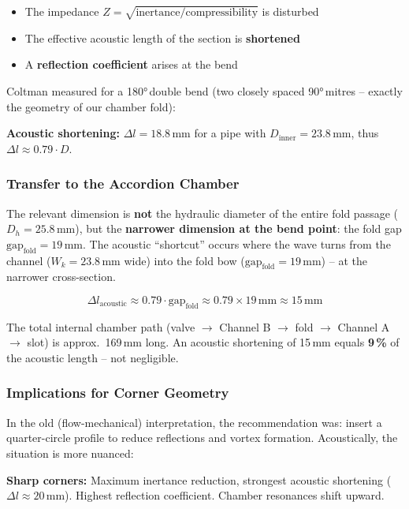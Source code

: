 \documentclass[11pt,a4paper]{article}
\begin{document}
\begin{itemize}[leftmargin=5mm, itemsep=1pt]
\item The impedance $Z = \sqrt{\text{inertance}/\text{compressibility}}$ is disturbed
\item The effective acoustic length of the section is \textbf{shortened}
\item A \textbf{reflection coefficient} arises at the bend
\end{itemize}

Coltman measured for a 180°\,double bend (two closely spaced 90°\,mitres -- exactly the geometry of our chamber fold):

\textbf{Acoustic shortening:} $\Delta l = 18.8$\,mm for a pipe with $D_\text{inner} = 23.8$\,mm, thus $\Delta l \approx 0.79 \cdot D$.

\subsubsection{Transfer to the Accordion Chamber}

The relevant dimension is \textbf{not} the hydraulic diameter of the entire fold passage ($D_h = 25.8$\,mm), but the \textbf{narrower dimension at the bend point}: the fold gap $\text{gap}_\text{fold} = 19$\,mm. The acoustic ``shortcut'' occurs where the wave turns from the channel ($W_k = 23.8$\,mm wide) into the fold bow ($\text{gap}_\text{fold} = 19$\,mm) -- at the narrower cross-section.

\begin{equation*}
\Delta l_\text{acoustic} \approx 0.79 \cdot \text{gap}_\text{fold} \approx 0.79 \times 19\,\text{mm} \approx 15\,\text{mm}
\end{equation*}

The total internal chamber path (valve $\to$ Channel B $\to$ fold $\to$ Channel A $\to$ slot) is approx.\ 169\,mm long. An acoustic shortening of 15\,mm equals \textbf{9\,\%} of the acoustic length -- not negligible.

\subsubsection{Implications for Corner Geometry}

In the old (flow-mechanical) interpretation, the recommendation was: insert a quarter-circle profile to reduce reflections and vortex formation. Acoustically, the situation is more nuanced:

\textbf{Sharp corners:} Maximum inertance reduction, strongest acoustic shortening ($\Delta l \approx 20$\,mm). Highest reflection coefficient. Chamber resonances shift upward.
\end{document}

